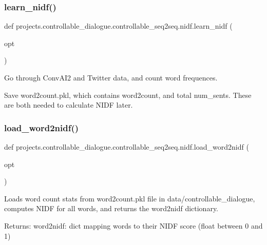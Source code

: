 \subsubsection{\texorpdfstring{learn\+\_\+nidf()}{learn\_nidf()}}
{\footnotesize\ttfamily def projects.\+controllable\+\_\+dialogue.\+controllable\+\_\+seq2seq.\+nidf.\+learn\+\_\+nidf (\begin{DoxyParamCaption}\item[{}]{opt }\end{DoxyParamCaption})}

\begin{DoxyVerb}Go through ConvAI2 and Twitter data, and count word frequences.

Save word2count.pkl, which contains word2count, and total num_sents. These are both
needed to calculate NIDF later.
\end{DoxyVerb}
 \mbox{\label{namespaceprojects_1_1controllable__dialogue_1_1controllable__seq2seq_1_1nidf_a2f882ed55572a6f2f7558732a6a692ee}} 
\subsubsection{\texorpdfstring{load\+\_\+word2nidf()}{load\_word2nidf()}}
{\footnotesize\ttfamily def projects.\+controllable\+\_\+dialogue.\+controllable\+\_\+seq2seq.\+nidf.\+load\+\_\+word2nidf (\begin{DoxyParamCaption}\item[{}]{opt }\end{DoxyParamCaption})}

\begin{DoxyVerb}Loads word count stats from word2count.pkl file in data/controllable_dialogue,
computes NIDF for all words, and returns the word2nidf dictionary.

Returns:
  word2nidf: dict mapping words to their NIDF score (float between 0 and 1)
\end{DoxyVerb}
 

